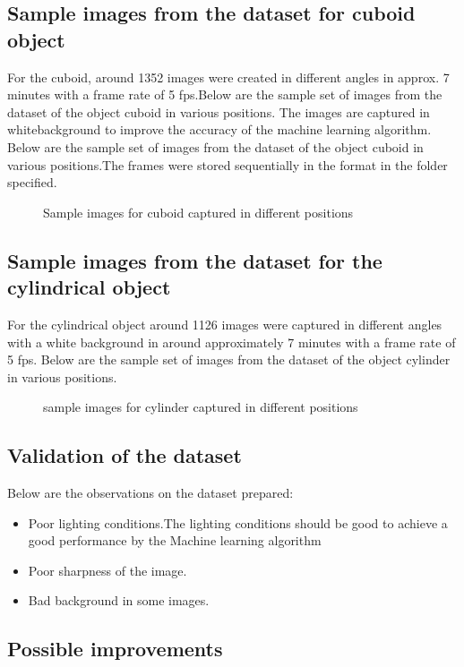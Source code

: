 \subsection{Sample images from the dataset for cuboid object}

For the cuboid, around 1352 images were created in different angles in approx. 7 minutes with a frame rate of 5 \ac{fps}.Below are the sample set of images from the dataset of the object cuboid in various positions. The images are captured in whitebackground to improve the accuracy of the machine learning algorithm. 
Below are the sample set of images from the dataset of the object cuboid in various positions.The frames were stored sequentially in the  format in the folder specified. 
\begin{figure}[H]
	\centering
	\caption{Sample images for cuboid captured in different positions}
\end{figure} 
\subsection{Sample images from the dataset for the cylindrical object}
For the cylindrical object around 1126 images were captured in different angles with a white background in around approximately 7 minutes with a frame rate of 5 \ac{fps}.
Below are the sample set of images from the dataset of the object cylinder in various positions. 
\begin{figure}[H]
	\centering
	\caption{sample images for cylinder captured in different positions}
\end{figure} 

\subsection{Validation of the dataset}

Below are the observations on the dataset prepared:
\begin{itemize}
	\item Poor lighting conditions.The lighting conditions should be good to achieve a good performance by the Machine learning algorithm
	\item Poor sharpness of the image.
	\item Bad background in some images.
\end{itemize}

\subsection{Possible improvements}

